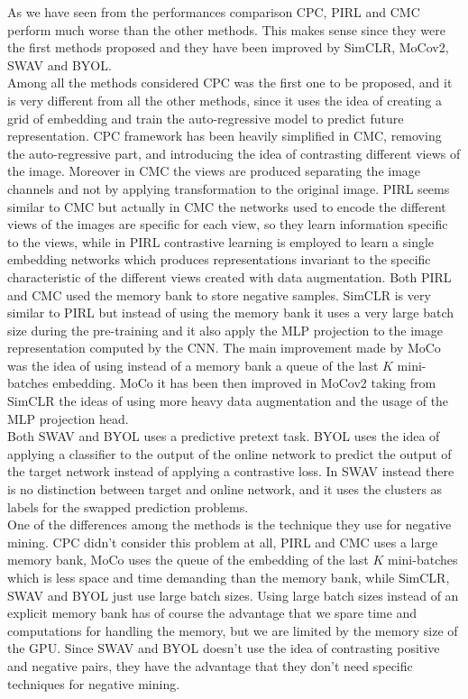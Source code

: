 As we have seen from the performances comparison CPC, PIRL and CMC perform much worse than the other methods. This makes sense since they were the first methods proposed and they have been improved by SimCLR, MoCov2, SWAV and BYOL.\\
Among all the methods considered CPC was the first one to be proposed, and it is very different from all the other methods, since it uses the idea of creating a grid of embedding and train the auto-regressive model to predict future representation. CPC framework has been heavily simplified in CMC, removing the auto-regressive part, and introducing the idea of contrasting different views of the image. Moreover in CMC the views are produced separating the image channels and not by applying transformation to the original image. PIRL seems similar to CMC but actually in CMC the networks used to encode the different views of the images are specific for each view, so they learn information specific to the views, while in PIRL contrastive learning is employed to learn a single embedding networks which produces representations invariant to the specific characteristic of the different views created with data augmentation. Both PIRL and CMC used the memory bank to store negative samples. SimCLR is very similar to PIRL but instead of using the memory bank it uses a very large batch size during the pre-training and it also apply the MLP projection to the image representation computed by the CNN. The main improvement made by MoCo was the idea of using instead of a memory bank a queue of the last $K$ mini-batches embedding. MoCo it has been then improved in MoCov2 taking from SimCLR the ideas of using more heavy data augmentation and the usage of the MLP projection head.\\
Both SWAV and BYOL uses a predictive pretext task. BYOL uses the idea of applying a classifier to the output of the online network to predict the output of the target network instead of applying a contrastive loss. In SWAV instead there is no distinction between target and online network, and it uses the clusters as labels for the swapped prediction problems.\\
One of the differences among the methods is the technique they use for negative mining. CPC didn't consider this problem at all, PIRL and CMC uses a large memory bank, MoCo uses the queue of the embedding of the last $K$ mini-batches which is less space and time demanding than the memory bank, while SimCLR, SWAV and BYOL just use large batch sizes. Using large batch sizes instead of an explicit memory bank has of course the advantage that we spare time and computations for handling the memory, but we are limited by the memory size of the GPU. Since SWAV and BYOL doesn't use the idea of contrasting positive and negative pairs, they have the advantage that they don't need specific techniques for negative mining.